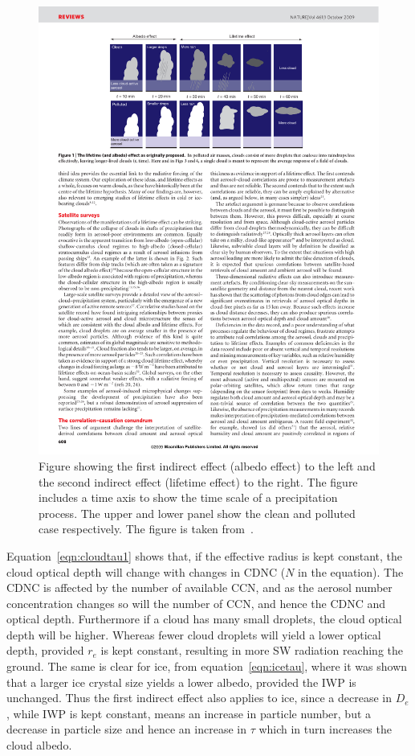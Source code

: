 \begin{figure}
\centering
\includegraphics[width=1.1\textwidth]{theory/indirecteffects.pdf}
\caption{Figure showing the first indirect effect (albedo effect) to the left and the second indirect effect (lifetime effect) to the right. The figure includes a time axis to show the time scale of a precipitation process. The upper and lower panel show the clean and polluted case respectively. The figure is taken from~\cite{Stevens2009}.}
\label{fig:indirecteffects}
\end{figure}

Equation~\ref{eqn:cloudtau1} shows that, if the effective radius is kept constant, the cloud optical depth will change with changes in CDNC ($N$ in the equation). The CDNC is affected by the number of available CCN, and as the aerosol number concentration changes so will the number of CCN, and hence the CDNC and optical depth. Furthermore if a cloud has many small droplets, the cloud optical depth will be higher. Whereas fewer cloud droplets will yield a lower optical depth, provided $r_e$ is kept constant, resulting in more SW radiation reaching the ground. The same is clear for ice, from equation~\ref{eqn:icetau}, where it was shown that a larger ice crystal size yields a lower albedo, provided the IWP is unchanged. Thus the first indirect effect also applies to ice, since a decrease in $D_e$, while IWP is kept constant, means an increase in particle number, but a decrease in particle size and hence an increase in $\tau$ which in turn increases the cloud albedo.

